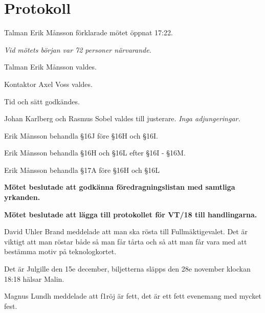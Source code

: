 \documentclass[10pt]{article}
\def\mo{Erik Månsson}
\def\ms{Axel Voss}
\begin{document}
\begin{comment}
	\subsection*{Adjungerande}
	\begin{narvarolista}
	\end{narvarolista}
\end{comment}
\newpage
\section*{Protokoll}

\begin{paragrafer}

Talman {\mo} förklarade mötet öppnat 17:22.

\emph{Vid mötets början var 72 personer närvarande.}

Talman {\mo} valdes.

Kontaktor {\ms} valdes.

Tid och sätt godkändes.


Johan Karlberg och Rasmus Sobel valdes till justerare.
\emph{Inga adjungeringar.}


Erik Månsson \ypa behandla \S16J före \S16H och \S16I.

Erik Månsson \ypa behandla \S16H och \S16L efter \S16I - \S16M.

Erik Månsson \ypa behandla \S17A före \S16H och \S16L

\textbf{Mötet beslutade att godkänna föredragningslistan med samtliga yrkanden.}

\textbf{Mötet beslutade att lägga till protokollet för VT/18 till handlingarna.}


David Uhler Brand meddelade att man ska rösta till Fullmäktigevalet. Det är viktigt att man röstar både så man får tårta och så att man får vara med att bestämma motiv på teknologkortet.

Det är Julgille den 15e december, biljetterna släpps den 28e november klockan 18:18 hälsar Malin.

Magnus Lundh meddelade att f1röj är fett, det är ett fett evenemang med mycket fest. 


\end{paragrafer}
\end{document}
